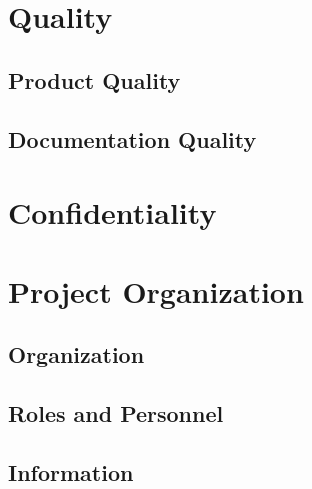 \documentclass{article}
\begin{document}
\newpage
\section{Quality}
\subsection{Product Quality}
\subsection{Documentation Quality}


\newpage
\section{Confidentiality}


\newpage
\section{Project Organization}
\subsection{Organization}
\subsection{Roles and Personnel}
\subsection{Information}


\newpage
\end{document}
